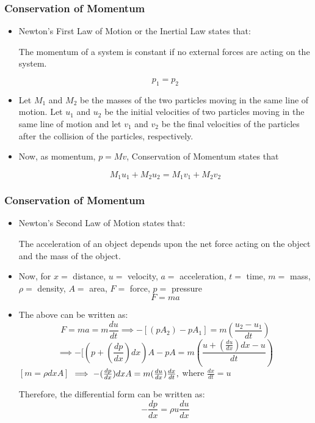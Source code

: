 \documentclass[10pt]{beamer}
\begin{document}
\begin{frame}
    \frametitle{Conservation of Momentum}
    \begin{itemize}
        \item Newton’s First Law of Motion or the Inertial Law states that:

            \quad \quad The momentum of a system is constant if no external forces are acting on the system.

            $$
            p_1 = p_2
            $$

        \item Let $M_1$ and $M_2$ be the masses of the two particles moving in the same line of motion. Let $u_1$  and $u_2$  be the initial velocities of two particles moving in the same line of motion and let $v_1$ and $v_2$  be the final velocities of the particles after the collision of the particles, respectively.

        \item Now, as momentum, $p = Mv$, Conservation of Momentum states that

            $$
            M_1u_1 + M_2u_2 = M_1v_1 + M_2v_2
            $$
    \end{itemize}
\end{frame}

\begin{frame}
    \fontsize{9pt}{10pt}\selectfont
    \frametitle{Conservation of Momentum}
    \begin{itemize}
        \item Newton’s Second Law of Motion states that:

        \quad \quad The acceleration of an object depends upon the net force acting on the object and the mass of the object.

        \item Now, for $x =$  distance, $u =$  velocity, $a =$  acceleration, $t =$  time, $m =$  mass, $\rho =$  density, $A =$  area, $F =$ force, $p =$ pressure
        $$
        F = ma
        $$
        \item The above can be written as:
            $$
            F = ma = m \frac {du} {dt} \implies -[(pA_2) - pA_1] = m(\frac {u_2 - u_1} {dt})
            $$
            $$
            \implies -[(p + (\frac {dp} {dx})dx)A - pA = m(\frac {u + (\frac{du} {dx})dx - u} {dt})
            $$
            $[m = \rho dx A]$
            $\implies \space - (\frac {dp} {dx})dxA = m(\frac {du} {dx}) \frac {dx} {dt},$  where $\frac {dx} {dt} = u$

        Therefore, the differential form can be written as:
        $$
        -\frac {dp}{dx} = \rho u \frac {du} {dx}
        $$
    \end{itemize}
\end{frame}
\end{document}
